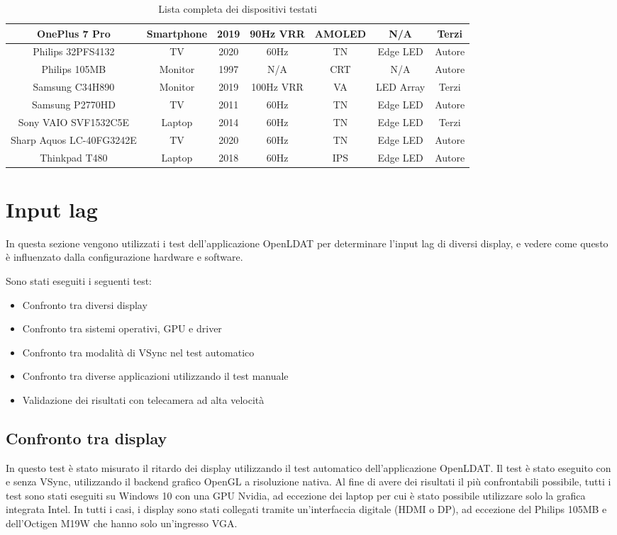 \begin{landscape}
\begin{table}[h!]
{\begin{tabular}{|c|c|c|c|c|c|c|}
			OnePlus 7 Pro & Smartphone & 2019 & 90Hz VRR & AMOLED & N/A & Terzi \\ \hline
			Philips 32PFS4132 & TV & 2020 & 60Hz & TN & Edge LED & Autore \\ \hline
			Philips 105MB & Monitor & 1997 & N/A & CRT & N/A & Autore \\ \hline
			Samsung C34H890 & Monitor & 2019 & 100Hz VRR & VA & LED Array & Terzi \\ \hline
			Samsung P2770HD & TV & 2011 & 60Hz & TN & Edge LED & Autore \\ \hline
			Sony VAIO SVF1532C5E & Laptop & 2014 & 60Hz & TN & Edge LED & Terzi \\ \hline
			Sharp Aquos LC-40FG3242E & TV & 2020 & 60Hz & TN & Edge LED & Autore \\ \hline
			Thinkpad T480 & Laptop & 2018 & 60Hz & IPS & Edge LED & Autore \\ \hline
		\end{tabular}
	}
	\caption{\label{tab:display_list}Lista completa dei dispositivi testati}
\end{table}
\end{landscape}

\section{Input lag}
In questa sezione vengono utilizzati i test dell'applicazione OpenLDAT per determinare l'input lag di diversi display, e vedere come questo è influenzato dalla configurazione hardware e software.

Sono stati eseguiti i seguenti test:\begin{itemize}
	\item Confronto tra diversi display
	\item Confronto tra sistemi operativi, GPU e driver
	\item Confronto tra modalità di VSync nel test automatico
	\item Confronto tra diverse applicazioni utilizzando il test manuale
	\item Validazione dei risultati con telecamera ad alta velocità
\end{itemize}

\subsection{Confronto tra display}
In questo test è stato misurato il ritardo dei display utilizzando il test automatico dell'applicazione OpenLDAT. Il test è stato eseguito con e senza VSync, utilizzando il backend grafico OpenGL a risoluzione nativa. Al fine di avere dei risultati il più confrontabili possibile, tutti i test sono stati eseguiti su Windows 10 con una GPU Nvidia, ad eccezione dei laptop per cui è stato possibile utilizzare solo la grafica integrata Intel. In tutti i casi, i display sono stati collegati tramite un'interfaccia digitale (HDMI o DP), ad eccezione del Philips 105MB e dell'Octigen M19W che hanno solo un'ingresso VGA.

